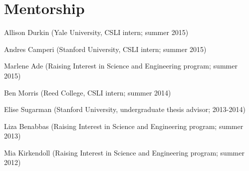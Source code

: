 \documentclass[letterpaper]{article}
\renewenvironment{itemize}{
  \begin{list}{}{
    \setlength{\leftmargin}{1.5em}
  }
}{
  \end{list}
}
\begin{document}
%

\section*{Mentorship}
\begin{itemize}
\item Allison Durkin (Yale University, CSLI intern; summer 2015)
\item Andres Camperi (Stanford University, CSLI intern; summer 2015)
\item Marlene Ade (Raising Interest in Science and Engineering program; summer 2015)
\item Ben Morris (Reed College, CSLI intern; summer 2014)
\item Elise Sugarman (Stanford University, undergraduate thesis advisor; 2013-2014)
\item Liza Benabbas (Raising Interest in Science and Engineering program; summer 2013)
\item Mia Kirkendoll (Raising Interest in Science and Engineering program; summer 2012)

\end{itemize}
\end{document}
